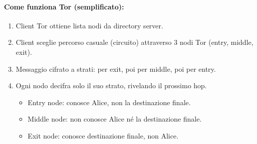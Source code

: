 \paragraph{Come funziona Tor (semplificato):}
\begin{enumerate}
    \item Client Tor ottiene lista nodi da directory server.
    \item Client sceglie percorso casuale (circuito) attraverso 3 nodi Tor (entry, middle, exit).
    \item Messaggio cifrato a strati: per exit, poi per middle, poi per entry.
    \item Ogni nodo decifra solo il suo strato, rivelando il prossimo hop.
        \begin{itemize}
            \item Entry node: conosce Alice, non la destinazione finale.
            \item Middle node: non conosce Alice né la destinazione finale.
            \item Exit node: conosce destinazione finale, non Alice.
        \end{itemize}
\end{enumerate}

